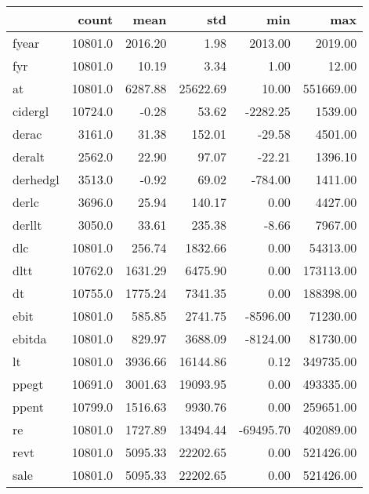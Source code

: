 \begin{tabular}{lrrrrr}
\toprule
{} &    count &      mean &       std &       min &         max \\
\midrule
fyear             &  10801.0 &   2016.20 &      1.98 &   2013.00 &     2019.00 \\
fyr               &  10801.0 &     10.19 &      3.34 &      1.00 &       12.00 \\
at                &  10801.0 &   6287.88 &  25622.69 &     10.00 &   551669.00 \\
cidergl           &  10724.0 &     -0.28 &     53.62 &  -2282.25 &     1539.00 \\
derac             &   3161.0 &     31.38 &    152.01 &    -29.58 &     4501.00 \\
deralt            &   2562.0 &     22.90 &     97.07 &    -22.21 &     1396.10 \\
derhedgl          &   3513.0 &     -0.92 &     69.02 &   -784.00 &     1411.00 \\
derlc             &   3696.0 &     25.94 &    140.17 &      0.00 &     4427.00 \\
derllt            &   3050.0 &     33.61 &    235.38 &     -8.66 &     7967.00 \\
dlc               &  10801.0 &    256.74 &   1832.66 &      0.00 &    54313.00 \\
dltt              &  10762.0 &   1631.29 &   6475.90 &      0.00 &   173113.00 \\
dt                &  10755.0 &   1775.24 &   7341.35 &      0.00 &   188398.00 \\
ebit              &  10801.0 &    585.85 &   2741.75 &  -8596.00 &    71230.00 \\
ebitda            &  10801.0 &    829.97 &   3688.09 &  -8124.00 &    81730.00 \\
lt                &  10801.0 &   3936.66 &  16144.86 &      0.12 &   349735.00 \\
ppegt             &  10691.0 &   3001.63 &  19093.95 &      0.00 &   493335.00 \\
ppent             &  10799.0 &   1516.63 &   9930.76 &      0.00 &   259651.00 \\
re                &  10801.0 &   1727.89 &  13494.44 & -69495.70 &   402089.00 \\
revt              &  10801.0 &   5095.33 &  22202.65 &      0.00 &   521426.00 \\
sale              &  10801.0 &   5095.33 &  22202.65 &      0.00 &   521426.00 \\

\end{tabular}
